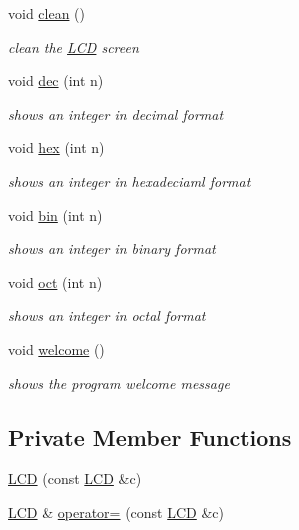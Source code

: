 \begin{DoxyCompactItemize}
void \hyperlink{class_l_c_d_a0faf36a77c08f7ca19ef7a6df81c3cea}{clean} ()
\begin{DoxyCompactList}\small\item\em clean the \hyperlink{class_l_c_d}{L\-C\-D} screen \end{DoxyCompactList}\item 
void \hyperlink{class_l_c_d_a444c14cc67983cdc179cdf97fda60194}{dec} (int n)
\begin{DoxyCompactList}\small\item\em shows an integer in decimal format \end{DoxyCompactList}\item 
void \hyperlink{class_l_c_d_a3dbdcf6441737a00891f70e472401f77}{hex} (int n)
\begin{DoxyCompactList}\small\item\em shows an integer in hexadeciaml format \end{DoxyCompactList}\item 
void \hyperlink{class_l_c_d_af549238d5b8990cc30115644f4c9138c}{bin} (int n)
\begin{DoxyCompactList}\small\item\em shows an integer in binary format \end{DoxyCompactList}\item 
void \hyperlink{class_l_c_d_ad0b68fbac8b664f506fae6b9af56d366}{oct} (int n)
\begin{DoxyCompactList}\small\item\em shows an integer in octal format \end{DoxyCompactList}\item 
void \hyperlink{class_l_c_d_ac73e78361f5a1004d37b399843d8b5a2}{welcome} ()
\begin{DoxyCompactList}\small\item\em shows the program welcome message \end{DoxyCompactList}\end{DoxyCompactItemize}
\subsection*{Private Member Functions}
\begin{DoxyCompactItemize}
\item 
\hyperlink{class_l_c_d_af0e1f361079353b77e3836eadba85149}{L\-C\-D} (const \hyperlink{class_l_c_d}{L\-C\-D} \&c)
\item 
\hyperlink{class_l_c_d}{L\-C\-D} \& \hyperlink{class_l_c_d_a417d9ed76eb050d25ce6fa6d91c871f1}{operator=} (const \hyperlink{class_l_c_d}{L\-C\-D} \&c)
\end{DoxyCompactItemize}

